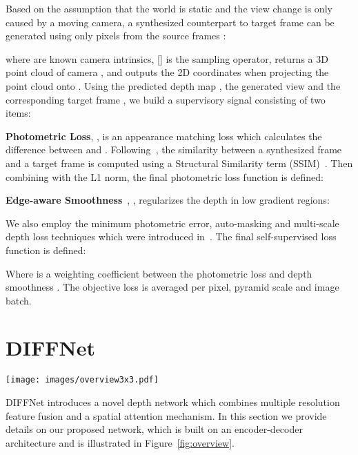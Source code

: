 \documentclass{bmvc2k}
\begin{document}
Based on the assumption that the world is static and the view change is only caused by a moving camera, a synthesized counterpart to target frame  can be generated using only pixels from the source frames :

where  are known camera intrinsics, [] is the sampling operator,  returns a 3D point cloud of camera , and  outputs the 2D coordinates when projecting the point cloud onto .     
Using the predicted depth map , the generated view  and the corresponding target frame , we build a supervisory signal consisting of two items:  

\noindent\textbf{Photometric Loss}, , is an appearance matching loss which calculates the difference between  and . Following~\cite{monodepth2,Godard17}, the similarity between a synthesized frame and a target frame is computed using a Structural Similarity term (SSIM)~\cite{wang2004}. Then combining with the L1 norm, the final photometric loss function is defined: 



\noindent\textbf{Edge-aware Smoothness}~\cite{Godard17}, , regularizes the depth in low gradient regions:

We also employ the minimum photometric error, auto-masking and multi-scale depth loss techniques which were introduced in~\cite{monodepth2}. The final self-supervised loss function is defined:

Where  is a weighting coefficient between the photometric loss  and depth smoothness . The objective loss is averaged per pixel, pyramid scale and image batch.




\section{DIFFNet}\label{sec:diffnet}
\begin{figure*}[t]
\centering
\texttt{[image: images/overview3x3.pdf]}
\caption{An overview of the DIFFNet depth network. The encoder uses feature fusion to generate stacks of multi-stage feature maps. The decoder uses an attention module and a  convolution layer to restore compressed feature maps at different scales.}
\label{fig:overview}
\end{figure*}

DIFFNet introduces a novel depth network which combines multiple resolution feature fusion and a spatial attention mechanism. In this section we provide details on our proposed network, which is built on an encoder-decoder architecture and is illustrated in Figure~\ref{fig:overview}. 
\end{document}
